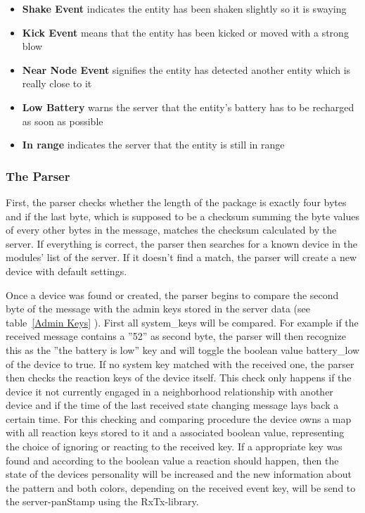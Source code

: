 \begin{itemize}
\item \textbf {Shake Event} indicates the entity has been shaken slightly so it is swaying
\item \textbf {Kick Event} means that the entity has been kicked or moved with a strong blow
\item \textbf {Near Node Event} signifies the entity has detected another entity which is really close to it
\item \textbf {Low Battery} warns the server that the entity's battery has to be recharged as soon as possible
\item \textbf {In range} indicates the server that the entity is still in range
\end{itemize}




\subsubsection{The Parser}
 
First, the parser checks whether the length of the package is exactly four bytes
and if the last byte, which is supposed to be a checksum summing the byte values
of every other bytes in the message, matches the checksum calculated by the
server. If everything is correct, the parser then searches for a known device in
the modules' list of the server. If it doesn't find a match, the parser will create a new device
with default settings. 

Once a device was found or created, the parser begins to compare the second byte of the message with the admin keys stored in the server data (see table~\ref{Admin Keys} ). First all system\_keys will be compared. For example if the received message contains a ''52'' as second byte, the parser will then recognize this as the ''the battery is low'' key and will toggle the boolean value battery\_low of the device to true. 
If no system key matched with the received one, the parser then checks the
reaction keys of the device itself. This check only happens if the device it not
currently engaged in a neighborhood relationship with another device and if the
time of the last received state changing message lays back a certain time. For
this checking and comparing procedure the device owns a map with all reaction
keys stored to it and a associated boolean value, representing the choice of
ignoring or reacting to the received key. If a appropriate key was found and
according to the boolean value a reaction should happen, then the state of the
devices personality will be increased and the new information about the pattern
and both colors, depending on the received event key, will be send to the
server-panStamp using the RxTx-library. 

